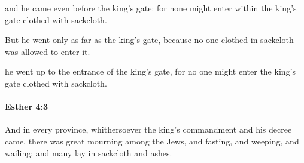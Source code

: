 			\begin{versebox}
					\item[BHS] 
					\item[LXX] 
					\item[ASV] and he came even before the king's gate: for none might enter within the king's gate clothed with sackcloth.
					\item[NIV] But he went only as far as the king’s gate, because no one clothed in sackcloth was allowed to enter it.
					\item[NRSV] he went up to the entrance of the king’s gate, for no one might enter the king’s gate clothed with sackcloth.
			\end{versebox}

		\paragraph{Esther 4:3} %
			\label{ESTHER-4-3}

			And in every province, whithersoever the king’s commandment and his decree came, there was great mourning among the Jews, and fasting, and weeping, and wailing; and many lay in sackcloth and ashes.

